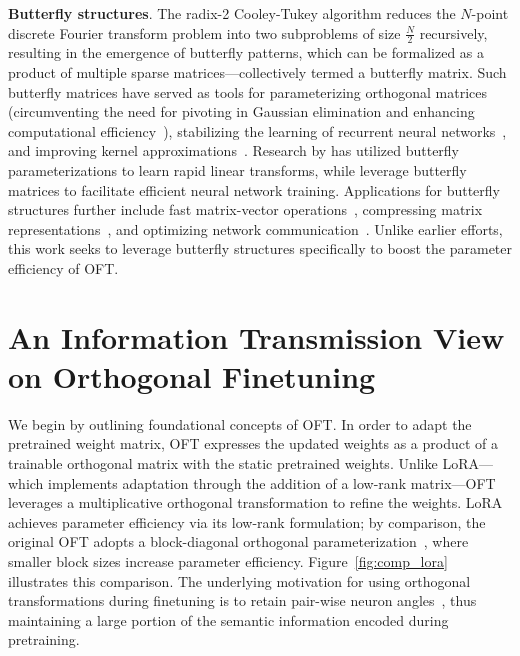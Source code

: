 \textbf{Butterfly structures}. The radix-2 Cooley-Tukey algorithm reduces the $N$-point discrete Fourier transform problem into two subproblems of size $\frac{N}{2}$ recursively, resulting in the emergence of butterfly patterns, which can be formalized as a product of multiple sparse matrices—collectively termed a butterfly matrix. Such butterfly matrices have served as tools for parameterizing orthogonal matrices (circumventing the need for pivoting in Gaussian elimination and enhancing computational efficiency~\cite{parker1995random}), stabilizing the learning of recurrent neural networks~\cite{jing2017tunable}, and improving kernel approximations~\cite{munkhoeva2018quadrature}. Research by \cite{dao2019learning,dao2019kaleidoscope} has utilized butterfly parameterizations to learn rapid linear transforms, while \cite{chen2022pixelated,dao2022monarch} leverage butterfly matrices to facilitate efficient neural network training. Applications for butterfly structures further include fast matrix-vector operations~\cite{michielssen1996multilevel,o2010algorithm}, compressing matrix representations~\cite{li2015butterfly}, and optimizing network communication~\cite{klasing1994broadcasting,li2003linear,rajasingh2016transmission}. Unlike earlier efforts, this work seeks to leverage butterfly structures specifically to boost the parameter efficiency of OFT.

\section{An Information Transmission View on Orthogonal Finetuning}

We begin by outlining foundational concepts of OFT. In order to adapt the pretrained weight matrix, OFT expresses the updated weights as a product of a trainable orthogonal matrix with the static pretrained weights. Unlike LoRA—which implements adaptation through the addition of a low-rank matrix—OFT leverages a multiplicative orthogonal transformation to refine the weights. LoRA achieves parameter efficiency via its low-rank formulation; by comparison, the original OFT adopts a block-diagonal orthogonal parameterization~\cite{qiu2023controlling}, where smaller block sizes increase parameter efficiency. Figure~\ref{fig:comp_lora} illustrates this comparison. The underlying motivation for using orthogonal transformations during finetuning is to retain pair-wise neuron angles~\cite{liu2018learning,liu2021orthogonal,qiu2023controlling}, thus maintaining a large portion of the semantic information encoded during pretraining.


